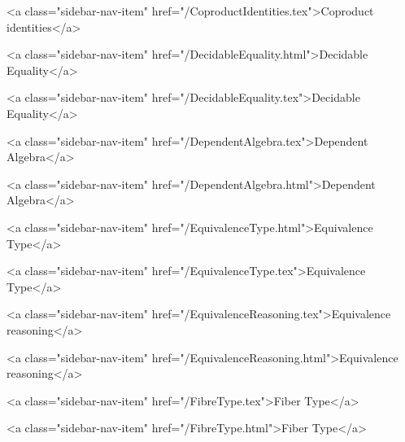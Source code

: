       
        
          <a class="sidebar-nav-item" href="/CoproductIdentities.tex">Coproduct identities</a>
        
      
    
      
        
          <a class="sidebar-nav-item" href="/DecidableEquality.html">Decidable Equality</a>
        
      
    
      
        
          <a class="sidebar-nav-item" href="/DecidableEquality.tex">Decidable Equality</a>
        
      
    
      
        
          <a class="sidebar-nav-item" href="/DependentAlgebra.tex">Dependent Algebra</a>
        
      
    
      
        
          <a class="sidebar-nav-item" href="/DependentAlgebra.html">Dependent Algebra</a>
        
      
    
      
        
          <a class="sidebar-nav-item" href="/EquivalenceType.html">Equivalence Type</a>
        
      
    
      
        
          <a class="sidebar-nav-item" href="/EquivalenceType.tex">Equivalence Type</a>
        
      
    
      
        
          <a class="sidebar-nav-item" href="/EquivalenceReasoning.tex">Equivalence reasoning</a>
        
      
    
      
        
          <a class="sidebar-nav-item" href="/EquivalenceReasoning.html">Equivalence reasoning</a>
        
      
    
      
        
          <a class="sidebar-nav-item" href="/FibreType.tex">Fiber Type</a>
        
      
    
      
        
          <a class="sidebar-nav-item" href="/FibreType.html">Fiber Type</a>
        
